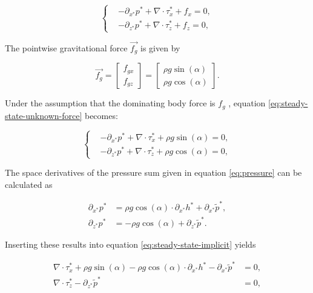 \begin{equation} \label{eq:steady-state-unknown-force}
  \begin{cases}
    &-\partial_{x^*} p^* + \nabla \cdot \tau_x^* + f_x = 0, \\
    &-\partial_{z^*} p^* + \nabla \cdot \tau_z^* + f_z = 0,
  \end{cases}
\end{equation}

The pointwise gravitational force $\vec{f_g}$ is given by

\begin{equation}
  \vec{f_g} = \begin{bmatrix} f_{gx} \\ f_{gz} \end{bmatrix} = \begin{bmatrix} \rho g \sin(\alpha) \\ \rho g \cos(\alpha) \end{bmatrix}.
\end{equation}

Under the assumption that the dominating body force is $f_g$ , equation \eqref{eq:steady-state-unknown-force} becomes:

\begin{equation} \label{eq:steady-state-implicit}
  \begin{cases}
    &-\partial_{x^*} p^* + \nabla \cdot \tau_x^* + \rho g \sin(\alpha) = 0, \\
    &-\partial_{z^*} p^* + \nabla \cdot \tau_z^* + \rho g \cos(\alpha) = 0,
  \end{cases}
\end{equation}

The space derivatives of the pressure sum given in equation \eqref{eq:pressure} can be calculated as

\begin{equation} \label{eq:pressure-space-derivative}
  \begin{align}
  \partial_{x^*} p^* &= \rho g \cos(\alpha) \cdot \partial_{x^*} h^* + \partial_{x^*} \tilde{p}^*, \\
  \partial_{z^*} p^* &= - \rho g \cos(\alpha) + \partial_{z^*} \tilde{p}^*.
  \end{align}
\end{equation}

Inserting these results into equation \eqref{eq:steady-state-implicit} yields

\begin{equation} \label{eq:steady-state-explicit}
  \begin{align}
    \nabla \cdot \tau_x^* + \rho g \sin(\alpha) - \rho g \cos(\alpha) \cdot \partial_{x^*} h^* - \partial_{x^*} \tilde{p}^* &= 0, \\
    \nabla \cdot \tau_z^* - \partial_{z^*} \tilde{p}^* &= 0,
  \end{align}
\end{equation}
